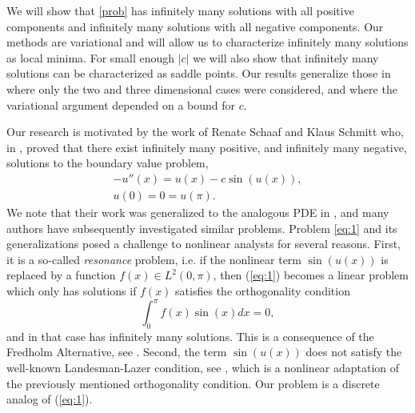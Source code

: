\documentclass[twoside]{article}
\begin{document}
 We will show that \eqref{prob} has infinitely many solutions with all positive components and infinitely many solutions with all negative components. Our methods are variational and will allow us to characterize infinitely many solutions as local minima. For small enough $|c|$ we will also show that infinitely many solutions can be characterized as saddle points. Our results generalize those in \cite{PR} where only the two and three dimensional cases were considered, and where the variational argument depended on a bound for $c$.

Our research is motivated by  the work of Renate Schaaf and Klaus Schmitt who, in \cite{RS}, proved that there exist infinitely many positive, and infinitely many negative, solutions to the boundary value problem,
\begin{equation}
\label{eq:1}
\begin{array}{c} -u''(x)=u(x)-c \sin(u(x)), \\ u(0)=0=u(\pi).\end{array}
\end{equation}
We note that their work was generalized to the analogous PDE in \cite{CJSS}, and many authors have subsequently investigated similar problems. Problem \eqref{eq:1} and its generalizations posed a challenge to nonlinear analysts for several reasons. First, it is a so-called {\em resonance} problem, i.e. if the nonlinear term $\sin (u(x))$ is replaced by a function $f(x)\in L^2(0,\pi)$, then (\ref{eq:1}) becomes a linear problem which only has solutions if $f(x)$ satisfies the orthogonality condition
 \[
 \int_0^{\pi}f(x)\sin (x)dx=0,
 \]
 and in that case has infinitely many solutions. This is a consequence of the Fredholm Alternative, see \cite{DM}. Second, the term $\sin (u(x))$ does not satisfy the well-known Landesman-Lazer condition, see \cite{LL}, which is a nonlinear adaptation of the previously mentioned orthogonality condition. Our problem is a discrete analog of (\ref{eq:1}).
\end{document}
